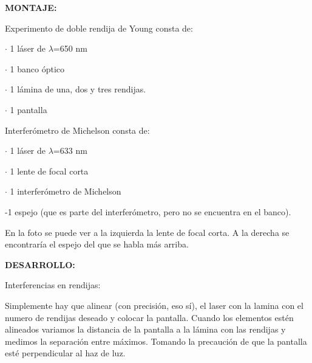 \documentclass[12pt,thmsa]{article}
\begin{document}
\vspace{1pt}

\textbf{MONTAJE:}

\vspace{1pt}

Experimento de doble rendija de Young consta de:

$\cdot$ 1 l\'{a}ser de $\lambda $=650 nm

$\cdot$ 1 banco \'{o}ptico

$\cdot$ 1 l\'{a}mina de una, dos y tres rendijas.

$\cdot$ 1 pantalla

\vspace{1pt}Interfer\'{o}metro de Michelson
consta de:

$\cdot$ 1 l\'{a}ser de $\lambda $=633 nm

$\cdot$ 1 lente de focal corta 

$\cdot$ 1 interfer\'{o}metro de Michelson

-1 espejo (que es parte del interfer\'{o}metro, pero no se encuentra en el
banco).


En la foto se puede ver a la izquierda la lente de focal corta. A la derecha
se encontrar\'{i}a el espejo del que se habla m\'{a}s arriba.

\textbf{DESARROLLO:}

Interferencias en rendijas:

Simplemente hay que alinear (con precisi\'{o}n, eso s\'{i}), el laser con la
lamina con el numero de rendijas deseado y colocar la pantalla. Cuando los
elementos est\'{e}n alineados variamos la distancia de la pantalla a la
l\'{a}mina con las rendijas y medimos la separaci\'{o}n entre m\'{a}ximos.
Tomando la precauci\'{o}n de que la pantalla est\'{e} perpendicular al haz
de luz.
\end{document}
